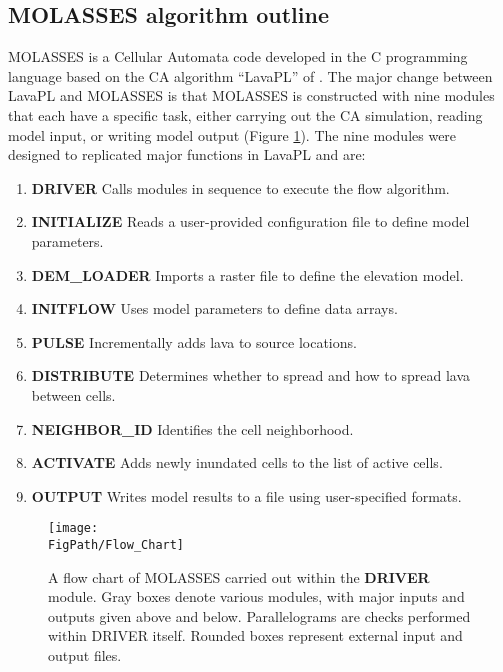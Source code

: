 	\subsection{MOLASSES algorithm outline}
		MOLASSES is a Cellular Automata code developed in the C programming language based on the CA algorithm ``LavaPL'' of \citet{connor2012probabilistic}. The major change between LavaPL and MOLASSES is that MOLASSES is constructed with nine modules that each have a specific task, either carrying out the CA simulation, reading model input, or writing model output (Figure \ref{fig_flowchart}). The nine modules were designed to replicated major functions in LavaPL and are:
		\begin{enumerate}
			\item{\textbf{DRIVER}} Calls modules in sequence to execute the flow algorithm.
			\item{\textbf{INITIALIZE}} Reads a user-provided configuration file to define model parameters.
			\item{\textbf{DEM\_LOADER}} Imports a raster file to define the elevation model.
			\item{\textbf{INITFLOW}} Uses model parameters to define data arrays.
			\item{\textbf{PULSE}} Incrementally adds lava to source locations.
			\item{\textbf{DISTRIBUTE}} Determines whether to spread and how to spread lava between cells.
			\item{\textbf{NEIGHBOR\_ID}} Identifies the cell neighborhood.
			\item{\textbf{ACTIVATE}} Adds newly inundated cells to the list of active cells.
			\item{\textbf{OUTPUT}} Writes model results to a file using user-specified formats.
		\end{enumerate}
		
		\begin{figure}[!h]
			\centering
			\texttt{[image: \\FigPath/Flow\_Chart]}
			\caption[A flow chart of MOLASSES carried out within the \textbf{DRIVER} module]{A flow chart of MOLASSES carried out within the \textbf{DRIVER} module. Gray boxes denote various modules, with major inputs and outputs given above and below. Parallelograms are checks performed within DRIVER itself. Rounded boxes represent external input and output files.}
			\label{fig_flowchart}
		\end{figure}
		
